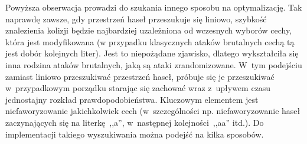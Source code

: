Powyższa obserwacja prowadzi do szukania innego sposobu na optymalizację. Tak
naprawdę zawsze, gdy przestrzeń haseł przeszukuje się liniowo, szybkość
znalezienia kolizji będzie najbardziej uzależniona od wczesnych wyborów cechy,
która jest modyfikowana (w przypadku klasycznych ataków brutalnych cechą tą
jest dobór kolejnych liter). Jest to niepożądane zjawisko, dlatego wykształciła
się inna rodzina ataków brutalnych, jaką są ataki zrandomizowane. W~tym
podejściu zamiast liniowo przeszukiwać przestrzeń haseł, próbuje się je
przeszukiwać w~przypadkowym porządku starając się zachować wraz z~upływem czasu
jednostajny rozkład prawdopodobieństwa. Kluczowym elementem jest
niefaworyzowanie jakichkolwiek cech (w~szczególności np. niefaworyzowanie haseł
zaczynających się na literkę~,,a'', w~następnej kolejności~,,aa'' itd.). Do
implementacji takiego wyszukiwania można podejść na kilka sposobów.

